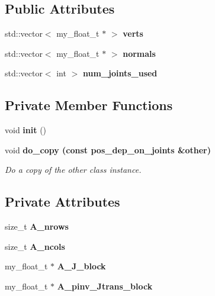 \subsection*{Public Attributes}
\begin{CompactItemize}
\item 
std::vector$<$ my\_\-float\_\-t $\ast$ $>$ \textbf{verts}\label{classSimSite3D_1_1pos__dep__on__joints_91721d7c401af41d94824188e80ad9f9}

\item 
std::vector$<$ my\_\-float\_\-t $\ast$ $>$ \textbf{normals}\label{classSimSite3D_1_1pos__dep__on__joints_f5e7d20d58cae9712b824f4cb41660b0}

\item 
std::vector$<$ int $>$ \textbf{num\_\-joints\_\-used}\label{classSimSite3D_1_1pos__dep__on__joints_6987ae9ce8f695eb21f9dc8d4ad7f296}

\end{CompactItemize}
\subsection*{Private Member Functions}
\begin{CompactItemize}
\item 
void \textbf{init} ()\label{classSimSite3D_1_1pos__dep__on__joints_904b7dd4afc1827c776ca2253c2e1add}

\item 
void \bf{do\_\-copy} (const \bf{pos\_\-dep\_\-on\_\-joints} \&other)
\begin{CompactList}\small\item\em Do a copy of the other class instance. \item\end{CompactList}\end{CompactItemize}
\subsection*{Private Attributes}
\begin{CompactItemize}
\item 
size\_\-t \textbf{A\_\-nrows}\label{classSimSite3D_1_1pos__dep__on__joints_ca7c5a4887e8864b3e979779014830f1}

\item 
size\_\-t \textbf{A\_\-ncols}\label{classSimSite3D_1_1pos__dep__on__joints_c9a33cb5cf6e0a3ca336546dc6ce0357}

\item 
my\_\-float\_\-t $\ast$ \textbf{A\_\-J\_\-block}\label{classSimSite3D_1_1pos__dep__on__joints_bc866573b0c3f4e4c77b67924fa40076}

\item 
my\_\-float\_\-t $\ast$ \textbf{A\_\-pinv\_\-Jtrans\_\-block}\label{classSimSite3D_1_1pos__dep__on__joints_800d04add909fab6d2d09bf41a298f40}

\end{CompactItemize}


